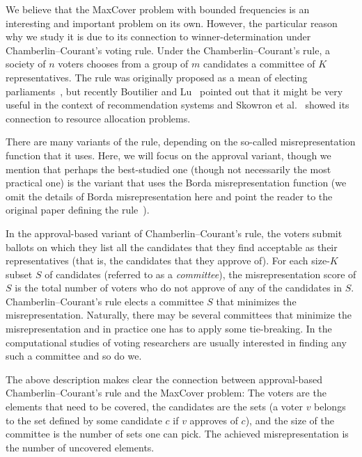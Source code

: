 \documentclass[11pt]{article}
\begin{document}
We believe that the MaxCover problem with bounded frequencies is
an interesting and important problem on its own. However, the
particular reason why we study it is due to its connection to
winner-determination under Chamberlin--Courant's voting rule. Under
the Chamberlin--Courant's rule, a society of $n$ voters chooses from a
group of $m$ candidates a committee of $K$ representatives. The rule
was originally proposed as a mean of electing
parliaments~\cite{ccElection}, but recently Boutilier and
Lu~\cite{budgetSocialChoice} pointed out that it might be very useful
in the context of recommendation systems and Skowron et
al.~\cite{sko-fal-sli:c:multiwinner} showed its connection to 
resource allocation problems.

There are many variants of the rule, depending on the so-called
misrepresentation function that it uses. Here, we will focus on the
approval variant, though we mention that perhaps the best-studied one
(though not necessarily the most practical one) is the variant that
uses the Borda misrepresentation function (we omit the details of
Borda misrepresentation here and point the reader to the original
paper defining the rule~\cite{ccElection}).

In the approval-based variant of Chamberlin--Courant's rule, the
voters submit ballots on which they list all the candidates that they
find acceptable as their representatives (that is, the candidates that
they approve of). For each size-$K$ subset $S$ of candidates (referred
to as a \emph{committee}), the misrepresentation score of $S$ is the
total number of voters who do not approve of any of the candidates in
$S$. Chamberlin--Courant's rule elects a committee $S$ that minimizes
the misrepresentation.  Naturally, there may be several committees
that minimize the misrepresentation and in practice one has to apply
some tie-breaking. In the computational studies of voting researchers
are usually interested in finding any such a committee and so do we.

The above description makes clear the connection between
approval-based Chamberlin--Courant's rule and the MaxCover problem:
The voters are the elements that need to be covered, the candidates
are the sets (a voter $v$ belongs to the set defined by some candidate
$c$ if $v$ approves of $c$), and the size of the committee is the
number of sets one can pick. The achieved misrepresentation is the
number of uncovered elements.
\end{document}
